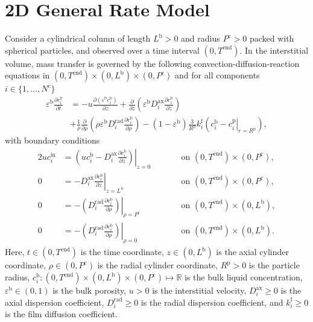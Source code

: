 \documentclass{article}
\begin{document}
\section*{2D General Rate Model}
Consider a cylindrical column of length $L^{\mathrm{b}} > 0$ and radius $P^{\mathrm{c}} > 0$ packed with spherical particles, and observed over a time interval $(0, T^{\mathrm{end}})$.
In the interstitial volume, mass transfer is governed by the following convection-diffusion-reaction equations in $(0, T^{\mathrm{end}})\times (0, L^{\mathrm{b}})\times (0, P^{\mathrm{c}})$ and for all components $i\in\{1, \dots, N^{\mathrm{c}} \}$
\begin{align}
    \varepsilon^{\mathrm{b}} \frac{\partial c^{\mathrm{b}}_{i}}{\partial t}
    &= - u \frac{\partial \left( \varepsilon^{\mathrm{b}} c^{\mathrm{b}}_{i} \right)}{\partial z}
        + \frac{\partial}{\partial z} \left( \varepsilon^{\mathrm{b}} D^{\mathrm{ax}}_{i} \frac{\partial c^{\mathrm{b}}_{i}}{\partial z} \right) \nonumber
    \\
    &+ \frac{1}{\rho} \frac{\partial}{\partial \rho} \left( \rho \varepsilon^{\mathrm{b}} D^{\mathrm{rad}}_{i} \frac{\partial c^{\mathrm{b}}_{i}}{\partial \rho} \right)
        - \left(1 - \varepsilon^{\mathrm{b}} \right) \frac{3}{R^{\mathrm{p}}} k^{\mathrm{f}}_{i} \left(c^{\mathrm{b}}_{i} - \left. c^{\mathrm{p}}_{i} \right|_{r = R^{\mathrm{p}}} \right),
\end{align}
with boundary conditions
\begin{alignat}{2}
    u c^{\mathrm{in}}_{i}
    &= \left.\left( u c^{\mathrm{b}}_{i} - D^{\mathrm{ax}}_{i} \frac{\partial c^{\mathrm{b}}_{i}}{\partial z}\right)\right|_{z=0}
    & & \qquad\text{on }(0, T^{\mathrm{end}})\times (0, P^{\mathrm{c}}),
    \\
    0
    &= - D^{\mathrm{ax}}_{i} \left. \frac{\partial c^{\mathrm{b}}_{i}}{\partial z} \right|_{z=L^{\mathrm{b}}}
    & & \qquad\text{on }(0, T^{\mathrm{end}})\times (0, P^{\mathrm{c}}),
    \\
    0
    &= - \left(D^{\mathrm{rad}}_{i} \left. \frac{\partial c^{\mathrm{b}}_{i}}{\partial \rho} \right) \right|_{\rho=P^{\mathrm{c}}}
    & & \qquad\text{on }(0, T^{\mathrm{end}}) \times (0, L^{\mathrm{b}}),
    \\
    0
    &= - \left(D^{\mathrm{rad}}_{i} \left. \frac{\partial c^{\mathrm{b}}_{i}}{\partial \rho} \right) \right|_{\rho=0}
    & & \qquad\text{on }(0, T^{\mathrm{end}}) \times (0, L^{\mathrm{b}}).
\end{alignat}
Here, $t\in (0, T^{\mathrm{end}})$ is the time coordinate, $z\in (0, L^{\mathrm{b}})$ is the axial cylinder coordinate, $\rho\in (0, P^{\mathrm{c}})$ is the radial cylinder coordinate, $R^{\mathrm{p}}> 0$ is the particle radius, $c^{\mathrm{b}}_{i}\colon (0, T^{\mathrm{end}})\times (0, L^{\mathrm{b}})\times (0, P^{\mathrm{c}}) \mapsto \mathbb{R}$ is the bulk liquid concentration, $\varepsilon^{\mathrm{b}}\in (0, 1)$ is the bulk porosity, $u> 0$ is the interstitial velocity, $D^{\mathrm{ax}}_{i}\geq 0$ is the axial dispersion coefficient, $D^{\mathrm{rad}}_{i}\geq 0$ is the radial dispersion coefficient, and $k^{\mathrm{f}}_{i}\geq 0$ is the film diffusion coefficient.
\end{document}
